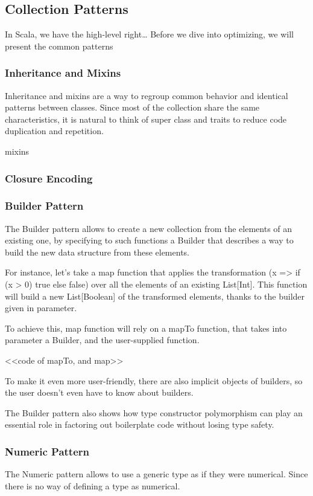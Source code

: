 \subsection{Collection Patterns}

In Scala, we have the high-level right\ldots
Before we dive into optimizing, we will present the common patterns

\subsubsection{Inheritance and Mixins}

Inheritance and mixins are a way to regroup common behavior and identical
patterns between classes. Since most of the collection share the same
characteristics, it is natural to think of super class and traits to reduce code
duplication and repetition.

mixins \cite{scalable-component-abstractions}

\subsubsection{Closure Encoding}



\subsubsection{Builder Pattern}

The Builder pattern allows to create a new collection from the elements of an
existing one, by specifying to such functions a Builder that describes a way to
build the new data structure from these elements.

For instance, let's take a map function that applies the transformation (x =>
if (x > 0) true else false) over all the elements of an existing List[Int]. This
function will build a new List[Boolean] of the transformed elements, thanks to
the builder given in parameter.

To achieve this, map function will rely on a mapTo function, that takes into
parameter a Builder, and the user-supplied function.

<<code of mapTo, and map>>

To make it even more user-friendly, there are also implicit objects of
builders, so the user doesn't even have to know about builders.

The Builder pattern also shows how type constructor polymorphism can play an
essential role in factoring out boilerplate code without losing type safety.\cite{adriaan}

\subsubsection{Numeric Pattern}

The Numeric pattern allows to use a generic type as if they were numerical.
Since there is no way of defining a type as numerical.
